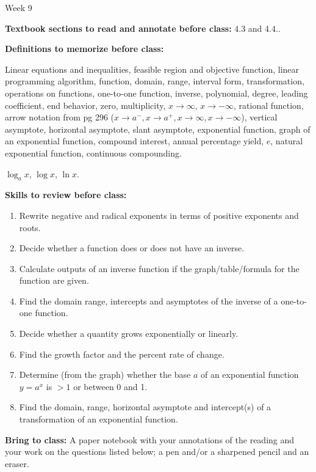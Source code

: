 \documentclass[12pt,dvipsnames]{article}
\begin{document}
\thispagestyle{empty}

	\begin{center}
		{\large{Week 9}}
	\end{center}

{\bfseries{Textbook sections to read and annotate before class:}} 4.3 and 4.4..

\smallskip

	{\bfseries{Definitions to memorize before class:}} 

\begin{description}[topsep=0pt,itemsep=-2ex,partopsep=0ex,parsep=1ex]
\item[From Weeks 1-6] Linear equations and inequalities, feasible region and objective function, linear programming algorithm,  function, domain, range, interval form, transformation, operations on functions, one-to-one function, inverse, polynomial, degree, leading coefficient, end behavior, zero, multiplicity, $x\to \infty$, $x\to -\infty$, rational function, arrow notation from pg 296 ($x\to a^{-}, x\to a^{+}, x\to \infty, x\to -\infty$), vertical asymptote, horizontal asymptote, slant asymptote, exponential function, graph of an exponential function, compound interest, annual percentage yield, $e$, natural exponential function, continuous compounding.
\item[From Sections 4.3, 4.4] $\log_a x$, $\log x$, $\ln x$.
\end{description}
\smallskip	
	
	{\bfseries{Skills to review before class:} }
\begin{multicols}{2}
	\begin{enumerate}[topsep=0pt,itemsep=-2ex,partopsep=0ex,parsep=1ex]
		
\item Rewrite negative and radical exponents in terms of positive exponents and roots.
			\item Decide whether a function does or does not have an inverse.
			\item Calculate outputs of an inverse function if the graph/table/formula for the function are given.
			\item Find the domain range, intercepts and asymptotes of the inverse of a one-to-one function.
			\item Decide whether a quantity grows exponentially or linearly.
\item Find the growth factor and the percent rate of change.
			\item Determine (from the graph) whether the base $a$ of an exponential function $\displaystyle y=a^x$ is $>1$ or between 0 and 1. 
			\item Find the domain, range, horizontal asymptote and intercept(s) of a transformation of an exponential function.
		
	\end{enumerate}
		
\end{multicols}
{\bfseries{Bring to class:} } A paper notebook with your annotations of the reading and your work on the questions listed below; a pen and/or a sharpened pencil and an eraser.
\end{document}
